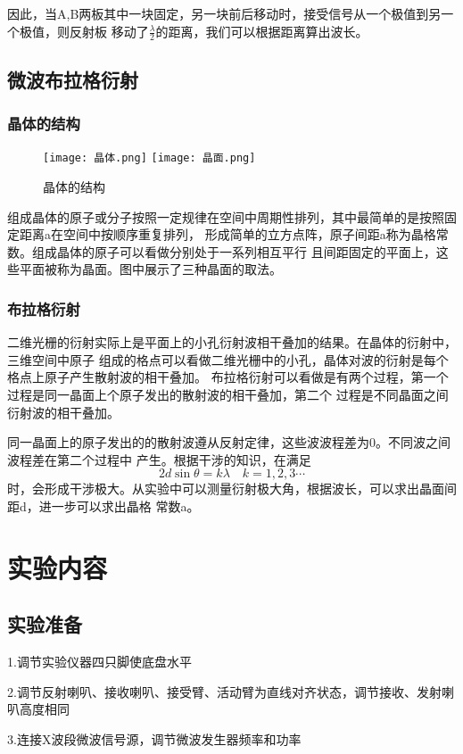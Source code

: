 \documentclass[12pt,a4paper]{article}
\begin{document}
    因此，当A,B两板其中一块固定，另一块前后移动时，接受信号从一个极值到另一个极值，则反射板
    移动了$\frac{\lambda }{2}$的距离，我们可以根据距离算出波长。

    \subsection{微波布拉格衍射}
    \subsubsection{晶体的结构}
        \begin{figure}[H]
            \centering
            \texttt{[image: 晶体.png]}
            \texttt{[image: 晶面.png]}
            \caption{晶体的结构}
        \end{figure}
    组成晶体的原子或分子按照一定规律在空间中周期性排列，其中最简单的是按照固定距离a在空间中按顺序重复排列，
    形成简单的立方点阵，原子间距a称为晶格常数。组成晶体的原子可以看做分别处于一系列相互平行
    且间距固定的平面上，这些平面被称为晶面。图中展示了三种晶面的取法。

    \subsubsection{布拉格衍射}
    二维光栅的衍射实际上是平面上的小孔衍射波相干叠加的结果。在晶体的衍射中，三维空间中原子
    组成的格点可以看做二维光栅中的小孔，晶体对波的衍射是每个格点上原子产生散射波的相干叠加。
    布拉格衍射可以看做是有两个过程，第一个过程是同一晶面上个原子发出的散射波的相干叠加，第二个
    过程是不同晶面之间衍射波的相干叠加。

    同一晶面上的原子发出的的散射波遵从反射定律，这些波波程差为0。不同波之间波程差在第二个过程中
    产生。根据干涉的知识，在满足
    \begin{equation}
        2d\sin \theta  = k\lambda \quad k = 1,2,3 \cdots 
    \end{equation}
    时，会形成干涉极大。从实验中可以测量衍射极大角，根据波长，可以求出晶面间距d，进一步可以求出晶格
    常数a。
\section{实验内容}
    \subsection{实验准备}
    1.调节实验仪器四只脚使底盘水平\par
    2.调节反射喇叭、接收喇叭、接受臂、活动臂为直线对齐状态，调节接收、发射喇叭高度相同\par
    3.连接X波段微波信号源，调节微波发生器频率和功率
\end{document}
